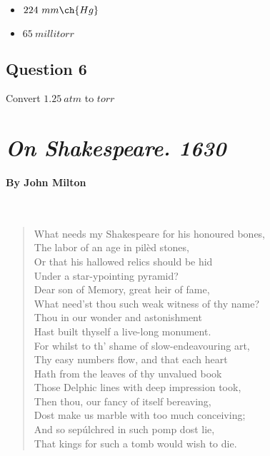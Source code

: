 \documentclass[11pt, letterpaper]{memoir}
\begin{document}
{\begin{itemize}
	\item $224~mm\ch{Hg}$
	
	\vspace{1em}
	\item $65~millitorr$
\end{itemize}

\vspace{1em}
\subsection*{Question 6}
Convert $1.25~atm$ to $torr$

\newpage
{}
\pagestyle{empty}
\addtocounter{page}{-1}
\section*{\emph{On Shakespeare. 1630}}
\paragraph{By John Milton}~
\begin{verse}
	What needs my Shakespeare for his honoured bones,\\
	The labor of an age in pilèd stones,\\
	Or that his hallowed relics should be hid\\
	Under a star-ypointing pyramid?\\
	Dear son of Memory, great heir of fame,\\
	What need’st thou such weak witness of thy name?\\
	Thou in our wonder and astonishment\\
	Hast built thyself a live-long monument.\\
	For whilst to th’ shame of slow-endeavouring art,\\
	Thy easy numbers flow, and that each heart\\
	Hath from the leaves of thy unvalued book\\
	Those Delphic lines with deep impression took,\\ 
	Then thou, our fancy of itself bereaving,\\
	Dost make us marble with too much conceiving;\\
	And so sepúlchred in such pomp dost lie,\\
	That kings for such a tomb would wish to die.
\end{verse}

}
\end{document}
